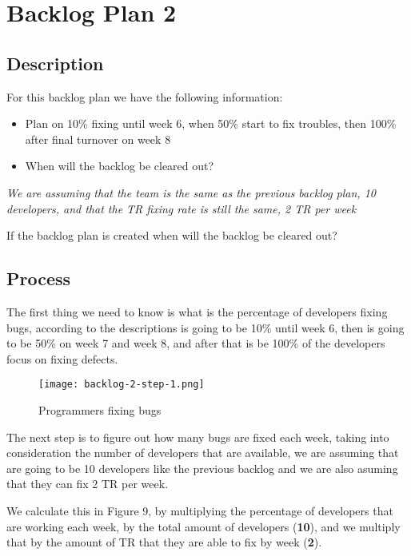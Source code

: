 \section{Backlog Plan 2}
\subsection{Description}
For this backlog plan we have the following information:
\begin{itemize}
    \item Plan on 10\% fixing until week 6, when 50\% start to fix troubles, then 100\% after final turnover on week 8
    \item When will the backlog be cleared out?
\end{itemize}
\textit{We are assuming that the team is the same as the previous backlog 
plan, 10 developers, and that the TR fixing rate is still the 
same, 2 TR per week}\newline

\noindent
If the backlog plan is created when will the backlog be cleared out?

\subsection{Process}
The first thing we need to know is what is the percentage of developers fixing 
bugs, according to the descriptions is going to be 10\% until week 6, 
then is going to be 50\% on week 7 and week 8, and after that is be 100\% of 
the developers focus on fixing defects.\newline

\begin{figure}[!htb]
    \centering
    \texttt{[image: backlog-2-step-1.png]}    
    \caption{Programmers fixing bugs}
\end{figure}

\noindent
The next step is to figure out how many bugs are fixed each week, taking into 
consideration the number of developers that are available, we are assuming that 
are going to be 10 developers like the previous backlog and we are also asuming 
that they can fix 2 TR per week.\newline

\pagebreak

\noindent
We calculate this in Figure 9, by multiplying the percentage of developers that
are working each week, by the total amount of developers (\textbf{10}), and we 
multiply that by the amount of TR that they are able to fix 
by week (\textbf{2}).\newline

